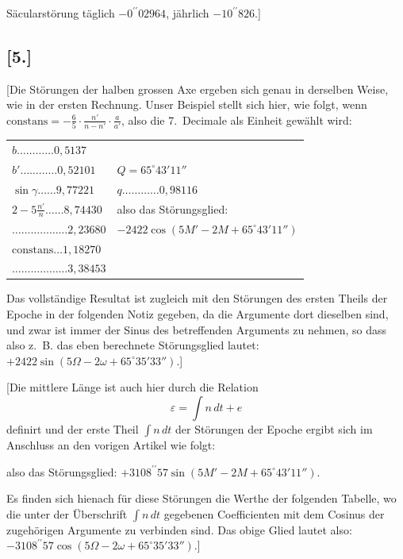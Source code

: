\documentclass[10pt,a4paper]{article}
\begin{document}
Säcularstörung täglich $-0^{\prime\prime}02964$, jährlich $-10^{\prime\prime}826$.]

\newpage
\subsection*{[5.]}

[Die Störungen der halben grossen Axe ergeben sich genau in derselben Weise, wie in der ersten 
Rechnung. Unser Beispiel stellt sich hier, wie folgt, wenn 
$\text{constans} = -\frac{6}{5} \cdot \frac{n'}{n - n'} \cdot \frac{a}{a'}$, also die 7.~Decimale als Einheit 
gewählt wird:

\begin{center}
\begin{tabular}{ll}
$b \ldots\ldots\ldots\ldots 0,5137$ & \\
$b' \ldots\ldots\ldots\ldots 0,52101$ & $Q = 65^{\circ}43'11''$ \\
$\sin \gamma \ldots\ldots 9,77221$ & $q \ldots\ldots\ldots\ldots 0,98116$ \\
$2 - 5\frac{n'}{n} \ldots\ldots 8,74430$ & also das Störungsglied: \\
$\ldots\ldots\ldots\ldots\ldots\ldots 2,23680$ & $-2422 \cos(5M' - 2M + 65^{\circ}43'11'')$ \\
$\text{constans} \ldots 1,18270$ & \\
$\ldots\ldots\ldots\ldots\ldots\ldots 3,38453$ & 
\end{tabular}
\end{center}

Das vollständige Resultat ist zugleich mit den Störungen des ersten Theils der Epoche in der folgenden 
Notiz gegeben, da die Argumente dort dieselben sind, und zwar ist immer der Sinus des betreffenden 
Arguments zu nehmen, so dass also z.~B. das eben berechnete Störungsglied lautet:
$+2422 \sin(5\Omega - 2\omega + 65^{\circ}35'33'')$.]

[Die mittlere Länge ist auch hier durch die Relation
\[
\varepsilon = \int n\,dt + e
\]
definirt und der erste Theil $\int n\,dt$ der Störungen der Epoche ergibt sich im Anschluss an den vorigen 
Artikel wie folgt:

also das Störungsglied: $+ 3108^{\prime\prime}57 \sin(5M' - 2M + 65^{\circ}43'11'')$.

Es finden sich hienach für diese Störungen die Werthe der folgenden Tabelle, wo die unter der 
Überschrift $\int n\,dt$ gegebenen Coefficienten mit dem Cosinus der zugehörigen Argumente zu verbinden sind. 
Das obige Glied lautet also: $-3108^{\prime\prime}57 \cos(5\Omega - 2\omega + 65^{\circ}35'33'')$.]
\end{document}
